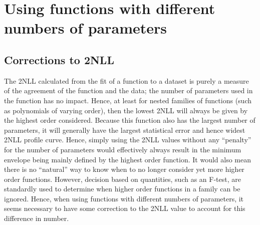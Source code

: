 \section{Using functions with different numbers of parameters} %
\label{sec:correction}

\subsection{Corrections to 2NLL}
\label{sec:correction:corrections}

The 2NLL calculated from the fit of a function to a dataset is purely a measure
of the agreement of the function and the data; the number of parameters
used in the function has no impact. Hence, at least for nested families of
functions (such as polynomials of varying order), then the lowest 2NLL will
always be given by the highest order considered.
Because this function also has the
largest number of parameters, it will generally have the largest statistical
error and hence widest 2NLL profile curve.
Hence, simply using the 2NLL values
without any ``penalty'' for the number of parameters would effectively
always result in the minimum envelope being mainly defined by the highest
order function. It would also mean there is no ``natural'' way to know when
to no longer consider yet more higher order functions. However, decision based
on quantities, such as an F-test, %
are standardly used to determine when higher order functions in
a family can be ignored. Hence, when using functions with different
numbers of parameters, it seems necessary to have some correction to the 2NLL
value to account for this difference in number.


